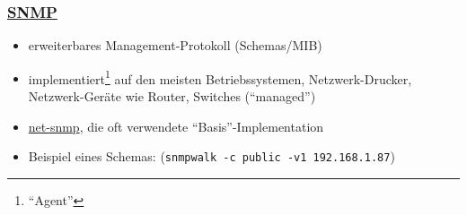 \documentclass[ignorenonframetext]{beamer}
\begin{document}
\begin{frame}
\frametitle{\href{https://en.wikipedia.org/wiki/Simple_Network_Management_Protocol}{SNMP}}
\begin{itemize}
    \item erweiterbares Management-Protokoll (Schemas/MIB)
	\item implementiert\footnote{``Agent''} auf den meisten Betriebssystemen, Netzwerk-Drucker, Netzwerk-Ger\"ate wie Router, Switches (``managed'')
	\item \href{http://www.net-snmp.org}{net-snmp}, die oft verwendete ``Basis''-Implementation
	\item Beispiel eines Schemas: (\texttt{snmpwalk -c public -v1 192.168.1.87})
\end{itemize}
\begin{center}
\begin{tiny}

\end{tiny}
\end{center}
\end{frame}
\end{document}

